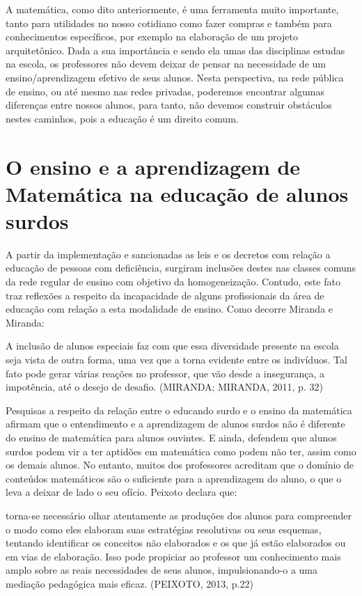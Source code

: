 \documentclass[brasil]{abnt}
\begin{document}
	A matemática, como dito anteriormente, é uma ferramenta muito importante, tanto para utilidades no nosso cotidiano como fazer compras e também para conhecimentos específicos, por exemplo na elaboração 
	de um projeto arquitetônico. Dada a sua importância e sendo ela umas das disciplinas estudas na escola, os professores não devem deixar de pensar na necessidade de um ensino/aprendizagem 
	efetivo de seus alunos. Nesta perspectiva, na rede pública de ensino, ou até mesmo nas redes privadas, poderemos encontrar algumas diferenças entre nossos alunos, para tanto, não devemos construir
	obstáculos nestes caminhos, pois a educação é um direito comum. 
	
 
	\section{O ensino e a aprendizagem de Matemática na educação de alunos surdos}	
	A partir da implementação e sancionadas as leis e os decretos com relação a educação de pessoas com deficiência, surgiram inclusões destes nas classes comuns da rede regular de ensino com objetivo da 
	homogeneização. Contudo, este fato traz reflexões a respeito da incapacidade de alguns profissionais da área de educação com relação a esta modalidade de ensino. Como decorre Miranda e Miranda:
		                 
			\begin{citacao} A inclusão de alunos especiais faz com que essa diversidade presente na escola seja vista de outra forma, uma vez que a torna evidente entre os indivíduos. Tal fato pode gerar 
							várias reações no professor, que vão desde a insegurança, a impotência, até o desejo de desafio. (MIRANDA; MIRANDA, 2011, p. 32)   			
			\end{citacao}
						
	Pesquisas a respeito da relação entre o educando surdo e o ensino da matemática afirmam que o entendimento e a aprendizagem de alunos surdos não é diferente do ensino de matemática para alunos ouvintes. 
	E ainda, defendem que alunos surdos podem vir a ter aptidões em matemática como podem não ter, assim como os demais alunos. No entanto, muitos dos professores acreditam que o domínio de conteúdos 
	matemáticos são o suficiente para a aprendizagem do aluno, o que o leva a deixar de lado o seu ofício. Peixoto declara que:
	
		\begin{citacao}[...] torna-se necessário olhar atentamente as produções dos alunos para compreender o modo como eles elaboram suas estratégias resolutivas ou seus esquemas, tentando identificar 
						os conceitos não elaborados e os que já estão elaborados ou em vias de elaboração. Isso pode propiciar ao professor um conhecimento mais amplo sobre as reais necessidades de seus 
						alunos, impulsionando-o a uma mediação pedagógica mais eficaz. (PEIXOTO, 2013, p.22)
		\end{citacao}
	
\end{document}
